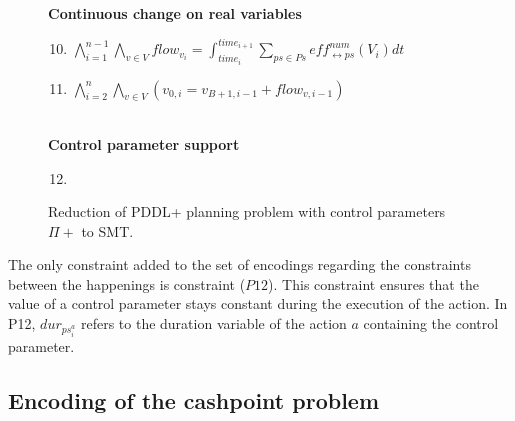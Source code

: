 \begin{figure}[thb!]
\begin{minipage}[t]{0.6\linewidth}
\begin{enumerate}[label=P\arabic*.]
\end{enumerate}
\textbf{Continuous change on real variables}
\begin{enumerate}[label=P\arabic*.]\setcounter{enumi}{9}
  \item $\bigwedge_{i=1}^{n-1} \bigwedge_{v\in V} flow_{v_i} = \int^{time_{i+1}}_{time_i} \sum_{ps\in Ps} eff^{num}_{\leftrightarrow ps}(V_i)dt$
  \item $\bigwedge_{i=2}^n \bigwedge_{v\in V} (v_{0,i} = v_{B+1,i-1} + flow_{v,i-1})$
\end{enumerate}
\end{minipage}
\vspace{1em}\\\textbf{Control parameter support}
\begin{enumerate}[label=P\arabic*.]\setcounter{enumi}{11}
 \item {}
\end{enumerate}
\caption{Reduction of PDDL+ planning problem with control parameters $\Pi+$ to SMT.}
\label{eq:plan2}
\end{figure}

The only constraint added to the set of encodings regarding the constraints between the happenings is  constraint ($P12$). This constraint ensures that the value of a control parameter stays constant during the execution of the action. In P12, $dur_{ps^a_i}$ refers to the duration variable of the action $a$ containing the control parameter.

\subsection{Encoding of the cashpoint problem}

